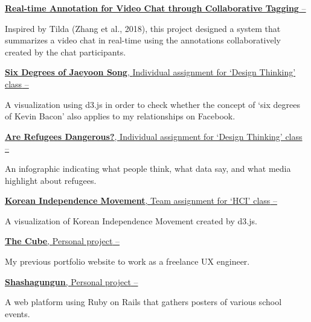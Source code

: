 \documentclass[letterpaper,MMMyyyy,nonstopmode]{template}
\begin{document}
\begin{Body}
\BigGap
\Entry
  \href{https://github.com/jyoonsong/RAVi}
  {\textbf{Real-time Annotation for Video Chat through Collaborative Tagging}
  \hfill
   --
  }

  \begin{Detail}
  \SubBulletItem
    Inspired by Tilda (Zhang et al., 2018), this project designed a system that summarizes a video chat in real-time using the annotations collaboratively created by the chat participants.
  \end{Detail}


\BigGap
\Entry
  \href{https://jaeyoon.io/dt4c}
  {\textbf{Six Degrees of Jaeyoon Song}, {\small{Individual assignment for `Design Thinking' class}}
  \hfill
   --
  }

  \begin{Detail}
  \SubBulletItem
    A visualization using d3.js in order to check whether the concept of `six degrees of Kevin Bacon' also applies to my relationships on Facebook.
  \end{Detail}

\BigGap
\Entry
  \href{https://jaeyoon.io/dt4c}
  {\textbf{Are Refugees Dangerous?}, {\small{Individual assignment for `Design Thinking' class}}
  \hfill
   --
  }

  \begin{Detail}
  \SubBulletItem
    An infographic indicating what people think, what data say, and what media highlight about refugees. 
  \end{Detail}

\BigGap
\Entry
  \href{https://jaeyoon.io/infovis}
  {\textbf{Korean Independence Movement}, {\small{Team assignment for `HCI' class}}
  \hfill
   --
  }
  \begin{Detail}
    \SubBulletItem
      A visualization of Korean Independence Movement created by d3.js.
  \end{Detail}

\BigGap
\Entry
  \href{https://jaeyoon.io}
  {\textbf{The Cube}, {\small{Personal project}}
  \hfill
   --
  }
  \begin{Detail}
    \SubBulletItem
      My previous portfolio website to work as a freelance UX engineer.
  \end{Detail}


\BigGap
\Entry
  \href{http://shashagungun.com}
  {\textbf{Shashagungun}, {\small{Personal project}}
  \hfill
   --
  }
  \begin{Detail}
    \SubBulletItem
      A web platform using Ruby on Rails that gathers posters of various school events.
  \end{Detail}



\end{Body}
\end{document}

